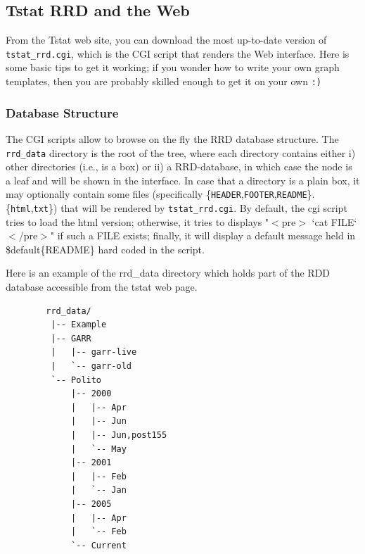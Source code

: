 \documentclass[11pt]{article}
\begin{document}
\subsection{Tstat RRD and the Web\label{Tstat_RRD_and_the_Web}}


From the Tstat web site, you can
download the most up-to-date version of \texttt{tstat\_rrd.cgi},
which is the CGI script that renders the Web interface.
Here is some basic tips to get it working; if you wonder
how to write your own graph templates, then you are probably
skilled enough to get it on your own \texttt{:)}

\subsubsection{Database Structure\label{Database_Structure}}


The CGI scripts allow to browse on the fly the RRD database structure.
The \texttt{rrd\_data} directory is the root of the tree, where each
directory contains either i) other directories (i.e., is a box) 
or ii) a RRD-database, in which case the node is a leaf and will be
shown in the interface. In case that a directory is a plain box, it may
optionally contain some files (specifically 
\{\texttt{HEADER},\texttt{FOOTER},\texttt{README}\}.\{\texttt{html},\texttt{txt}\})
that will be rendered by \texttt{tstat\_rrd.cgi}. 
By default, the cgi script tries to load the html version;
otherwise, it tries to displays "$<$pre$>$ `cat FILE` $<$/pre$>$"
if such a FILE exists; finally, it will display a default message
held in \$default\{README\} hard coded in the script.



Here is an example of the rrd\_data directory which holds part of the RDD database
accessible from the tstat web page.

\begin{small}\begin{verbatim}
        rrd_data/
         |-- Example
         |-- GARR
         |   |-- garr-live
         |   `-- garr-old
         `-- Polito
             |-- 2000
             |   |-- Apr
             |   |-- Jun
             |   |-- Jun,post155
             |   `-- May
             |-- 2001
             |   |-- Feb
             |   `-- Jan
             |-- 2005
             |   |-- Apr
             |   `-- Feb
             `-- Current
\end{verbatim}\end{small} \noindent
\end{document}
